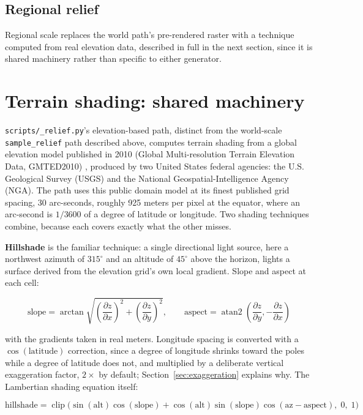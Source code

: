 \documentclass[11pt]{article}
\begin{document}
\subsection{Regional relief}

Regional scale replaces the world path's pre-rendered raster with a
technique computed from real elevation data, described in full in the
next section, since it is shared machinery rather than specific to
either generator.

\clearpage
\section{Terrain shading: shared machinery}
\label{sec:terrain-shading}

\texttt{scripts/\_relief.py}'s elevation-based path, distinct from the
world-scale \texttt{sample\_relief} path described above, computes
terrain shading from a global elevation model published in 2010
(Global Multi-resolution Terrain Elevation Data, GMTED2010)
\autocite{danielson-gmted2010}, produced by two United States federal
agencies: the U.S. Geological Survey (USGS) and the National
Geospatial-Intelligence Agency (NGA). The path uses this public domain
model at its finest published grid spacing, 30 arc-seconds, roughly 925
meters per pixel at the equator, where an arc-second is $1/3600$ of a
degree of latitude or longitude. Two shading techniques combine, because
each covers exactly what the other misses.

\textbf{Hillshade} is the familiar technique: a single directional
light source, here a northwest azimuth of $315^\circ$ and an altitude of
$45^\circ$ above the horizon, lights a surface derived from the
elevation grid's own local gradient. Slope and aspect at each cell:

\[
\text{slope} = \arctan\sqrt{\left(\frac{\partial z}{\partial x}\right)^2 + \left(\frac{\partial z}{\partial y}\right)^2}, \qquad
\text{aspect} = \operatorname{atan2}\!\left(\frac{\partial z}{\partial y}, -\frac{\partial z}{\partial x}\right)
\]

with the gradients taken in real meters. Longitude spacing is converted
with a $\cos(\text{latitude})$ correction, since a degree of longitude
shrinks toward the poles while a degree of latitude does not, and
multiplied by a deliberate vertical exaggeration factor, $2\times$ by
default; Section~\ref{sec:exaggeration} explains why. The Lambertian
shading equation itself:

\[
\text{hillshade} = \operatorname{clip}\Big(\sin(\text{alt})\cos(\text{slope}) + \cos(\text{alt})\sin(\text{slope})\cos(\text{az} - \text{aspect}),\; 0,\; 1\Big)
\]
\end{document}
